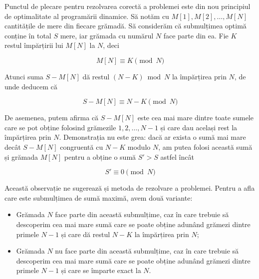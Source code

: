 Punctul de plecare pentru rezolvarea corectă a problemei este din nou
principiul de optimalitate al programării dinamice. Să notăm cu $M[1], M[2],
\dots, M[N]$ cantitățile de mere din fiecare grămadă. Să considerăm că
submulțimea optimă conține în total $S$ mere, iar grămada cu numărul $N$ face
parte din ea. Fie $K$ restul împărțirii lui $M[N]$ la $N$, deci

\begin{equation}
  M[N] \equiv K \pmod{N}
\end{equation}

Atunci suma $S - M[N]$ dă restul $(N-K) \bmod N$ la împărțirea prin $N$, de
unde deducem că

\begin{equation}
  S - M[N] \equiv N - K \pmod{N}
\end{equation}

De asemenea, putem afirma că $S - M[N]$ este cea mai mare dintre toate sumele
care se pot obține folosind grămezile $1, 2, \dots, N-1$ și care dau același
rest la împărțirea prin $N$. Demonstrația nu este grea: dacă ar exista o sumă
mai mare decât $S - M[N]$ congruentă cu $N - K$ modulo $N$, am putea folosi
această sumă și grămada $M[N]$ pentru a obține o sumă $S'>S$ astfel încât

\begin{equation}
  S' \equiv 0 \pmod{N}
\end{equation}

Această observație ne sugerează și metoda de rezolvare a problemei. Pentru a
afla care este submulțimea de sumă maximă, avem două variante:

\begin{itemize}

\item Grămada $N$ face parte din această submulțime, caz în care trebuie să
  descoperim cea mai mare sumă care se poate obține adunând grămezi dintre
  primele $N-1$ și care dă restul $N - K$ la împărțirea prin $N$;

\item Grămada $N$ nu face parte din această submulțime, caz în care trebuie să
  descoperim cea mai mare sumă care se poate obține adunând grămezi dintre
  primele $N-1$ și care se împarte exact la $N$.

\end{itemize}

